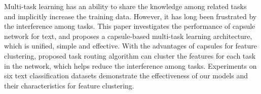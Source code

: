Multi-task learning has an ability to share the knowledge among related tasks and implicitly increase the training data. However, it has long been frustrated by the interference among tasks. This paper investigates the performance of capsule network for text, and proposes a capsule-based multi-task learning architecture, which is unified, simple and effective. With the advantages of capsules for feature clustering, proposed task routing algorithm can cluster the features for each task in the network, which helps reduce the interference among tasks. Experiments on six text classification datasets demonstrate the effectiveness of our models and their characteristics for feature clustering.
